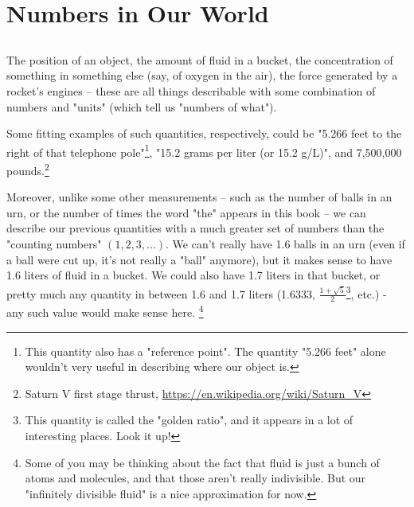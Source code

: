 \documentclass{article}
\begin{document}




\section{Numbers in Our World}

\subsection{}

The position of an object, the amount of fluid in a bucket, the concentration of something in something else (say, of oxygen in the air), the force generated by a rocket's engines -- these are all things describable with some combination of numbers and "units" (which tell us "numbers of what"). 


Some fitting examples of such quantities, respectively, could be "5.266 feet to the right of that telephone pole"\footnote{This quantity also has a "reference point". The quantity "5.266 feet" alone wouldn't very useful in describing where our object is.}, "15.2 grams per liter (or 15.2 g/L)", and 7,500,000 pounds.\footnote{Saturn V first stage thrust, \url{https://en.wikipedia.org/wiki/Saturn_V}}



Moreover, unlike some other measurements -- such as the number of balls in an urn, or the number of times the word "the" appears in this book -- we can describe our previous quantities with a much greater set of numbers than the "counting numbers" $(1, 2, 3, ...)$. We can't really have 1.6 balls in an urn (even if a ball were cut up, it's not really a "ball" anymore), but it makes sense to have 1.6 liters of fluid in a bucket. We could also have 1.7 liters in that bucket, or pretty much any quantity in between 1.6 and 1.7 liters (1.6333, $\frac{1 + \sqrt{5}}{2}$\footnote{This quantity is called the "golden ratio", and it appears in a lot of interesting places. Look it up!}, etc.) - any such value would make sense here. \footnote{Some of you may be thinking about the fact that fluid is just a bunch of atoms and molecules, and that those aren't really indivisible. But our "infinitely divisible fluid" is a nice approximation for now.}
\end{document}
